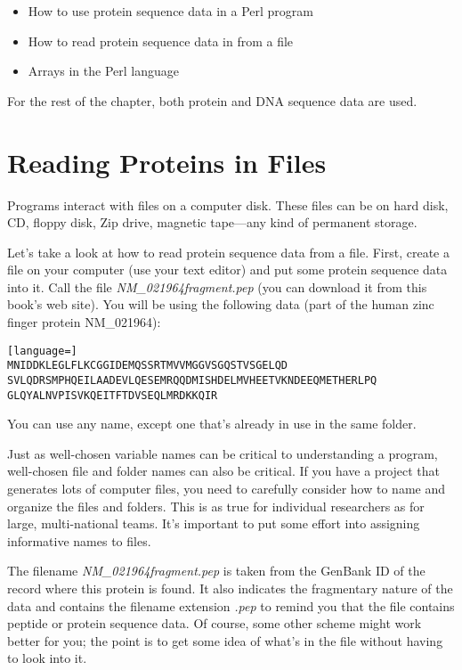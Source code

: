 \begin{itemize}
  \item How to use protein sequence data in a Perl program
  \item How to read protein sequence data in from a file
  \item Arrays in the Perl language
\end{itemize}

For the rest of the chapter, both protein and DNA sequence data are used. 

\section{Reading Proteins in Files}
Programs interact with files on a computer disk. These files can be on hard disk, CD, floppy disk, Zip drive, magnetic tape—any kind of permanent storage.

Let's take a look at how to read protein sequence data from a file. First, create a file on your computer (use your text editor) and put some protein sequence data into it. Call the file \textit{NM\_021964fragment.pep} (you can download it from this book's web site). You will be using the following data (part of the human zinc finger protein NM\_021964):

\begin{lstlisting}[language=]
MNIDDKLEGLFLKCGGIDEMQSSRTMVVMGGVSGQSTVSGELQD
SVLQDRSMPHQEILAADEVLQESEMRQQDMISHDELMVHEETVKNDEEQMETHERLPQ
GLQYALNVPISVKQEITFTDVSEQLMRDKKQIR
\end{lstlisting}

You can use any name, except one that's already in use in the same folder.

Just as well-chosen variable names can be critical to understanding a program, well-chosen file and folder names can also be critical. If you have a project that generates lots of computer files, you need to carefully consider how to name and organize the files and folders. This is as true for individual researchers as for large, multi-national teams. It's important to put some effort into assigning informative names to files.

The filename \textit{NM\_021964fragment.pep} is taken from the GenBank ID of the record where this protein is found. It also indicates the fragmentary nature of the data and contains the filename extension \textit{.pep} to remind you that the file contains peptide or protein sequence data. Of course, some other scheme might work better for you; the point is to get some idea of what's in the file without having to look into it.

